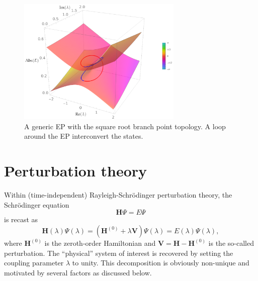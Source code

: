 \documentclass[11pt,a4paper]{article}
\newcommand{\bH}{\mathbf{H}}
\newcommand{\bV}{\mathbf{V}}
\begin{document}
\begin{figure}[h!]
    \centering
    \includegraphics[width=0.7\textwidth]{TopologyEP.pdf}
    \caption{\centering A generic EP with the square root branch point topology. A loop around the EP interconvert the states.}
    \label{fig:TopologyEP}
\end{figure}

\section{Perturbation theory}

Within (time-independent) Rayleigh-Schr\"odinger perturbation theory, the Schr\"odinger equation 
\begin{equation} \label{eq:SchrEq}
	\bH \Psi = E \Psi
\end{equation} 
is recast as 
\begin{equation} \label{eq:SchrEq-PT}
	\bH(\lambda) \Psi(\lambda) = (\bH^{(0)} + \lambda \bV ) \Psi(\lambda) = E(\lambda) \Psi(\lambda),
\end{equation}
where $\bH^{(0)}$ is the zeroth-order Hamiltonian and $\bV = \bH - \bH^{(0)}$ is the so-called perturbation.
The ``physical'' system of interest is recovered by setting the coupling parameter $\lambda$ to unity.
This decomposition is obviously non-unique and motivated by several factors as discussed below.
\end{document}
